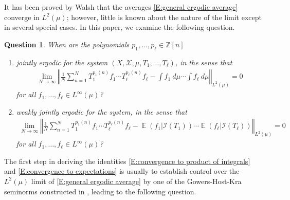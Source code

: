 \documentclass[11pt]{amsart}
\newtheorem{question}{Question}
\theoremstyle{definition}
\newcommand{\Z}{{\mathbb Z}}
\newcommand{\CI}{{\mathcal I}}
\newcommand{\CX}{{\mathcal X}}
\newcommand{\norm}[1]{\left\Vert #1\right\Vert}
\DeclareMathOperator*{\E}{\mathbb{E}}
\begin{document}
It has been proved by Walsh \cite{Wal12} that the averages \eqref{E:general ergodic average} converge in $L^2(\mu)$; however, little is known about the nature of the limit except in several special cases. In this paper, we examine the following question.
\begin{question}\label{Q:joint ergodicity}
When are the polynomials $p_1, \ldots, p_\ell\in\Z[n]$
\begin{enumerate}
    \item \label{i:joint erg} \emph{jointly ergodic} for the system $(X, \CX, \mu, T_1, \ldots, T_\ell)$, in the sense that
\begin{align}\label{E:convergence to product of integrals}
    \lim_{N\to\infty}\norm{\frac{1}{N}\sum_{n=1}^N T_1^{p_1(n)}f_1 \cdots T_\ell^{p_\ell(n)}f_\ell -
    \int f_1\ d\mu \cdots \int f_\ell\ d\mu}_{L^2(\mu)} = 0
\end{align}
for all $f_1, \ldots, f_\ell\in L^\infty(\mu)$?
    \item \label{i:weak joint erg} \emph{weakly jointly ergodic} for the system, in the sense that
\begin{align}\label{E:convergence to expectations}
    \lim_{N\to\infty}\norm{\frac{1}{N}\sum_{n=1}^N T_1^{p_1(n)}f_1 \cdots T_\ell^{p_\ell(n)}f_\ell -
    \E(f_1|\CI(T_1)) \cdots \E(f_\ell|\CI(T_\ell))}_{L^2(\mu)} = 0
\end{align}
for all $f_1, \ldots, f_\ell\in L^\infty(\mu)$?
\end{enumerate}

\end{question}



The first step in deriving the identities \eqref{E:convergence to product of integrals} and \eqref{E:convergence to expectations} is usually to establish control over the $L^2(\mu)$ limit of \eqref{E:general ergodic average} by one of the Gowers-Host-Kra seminorms constructed in \cite{HK05a}, leading to the following question.

\end{document}
